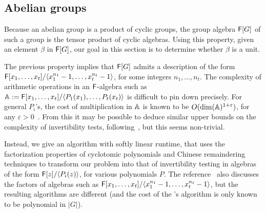 
\subsection{Abelian groups}

Because an abelian group is a product of cyclic groups, the group
algebra ${\mathsf{F}}[G]$ of such a group is the tensor product of cyclic
algebras. Using this property, given an element $\beta$ in ${\mathsf{F}}[G]$,
our goal in this section is to determine whether $\beta$ is a unit.

The previous property implies that ${\mathsf{F}}[G]$ admits a description of the
form ${\mathsf{F}}[x_1,\dots,x_t]/\langle x_1^{n_1}-1,\dots,x_t^{n_t}-1\rangle$,
for some integers $n_1,\dots,n_t$. The complexity of arithmetic
operations in an ${\mathsf{F}}$-algebra such as $\mathbb{A}:={\mathsf{F}}[x_1,\dots,x_t]/\langle
P_1(x_1),\dots,P_t(x_t)\rangle$ is difficult to pin down precisely. For
general $P_i$'s, the cost of multiplication in $\mathbb{A}$ is known to be
$O(\dim(\mathbb{A})^{1+\varepsilon})$, for any $\varepsilon >
0$~\cite[Theorem~2]{LiMoSc09}. From this it may be possible to deduce
similar upper bounds on the complexity of invertibility tests,
following~\cite{DaMMMScXi06}, but this seems non-trivial.

Instead, we give an algorithm with softly linear runtime, that uses
the factorization properties of cyclotomic polynomials and Chinese
remaindering techniques to transform our problem into that of invertibility
testing in algebras of the form ${\mathsf{F}}[z]/\langle P_i(z) \rangle$, for
various polynomials $P$. The reference~\cite{Pol94} also discusses the
factors of algebras such as ${\mathsf{F}}[x_1,\dots,x_t]/\langle
x_1^{n_1}-1,\dots,x_t^{n_t}-1\rangle$, but the resulting algorithms are 
different (and the cost of the \citeauthor{Pol94}'s \citeyear{Pol94} algorithm
is only known to be polynomial in $|G|$).

\smallskip


